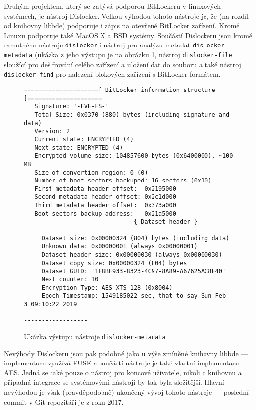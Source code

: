 
Druhým projektem, který se zabývá podporou BitLockeru v linuxových systémech, je nástroj Dislocker. Velkou výhodou tohoto nástroje je, že (na rozdíl od knihovny libbde) podporuje i zápis na otevřené BitLocker zařízení. Kromě Linuxu podporuje také MacOS X a BSD systémy. Součástí Dislockeru jsou kromě samotného nástroje \texttt{dislocker} i nástroj pro analýzu metadat \texttt{dislocker-metadata} (ukázka z jeho výstupu je na obrázku \ref{fig:dislocker-metadata}, nástroj \texttt{dislocker-file} sloužící pro dešifrování celého zařízení a uložení dat do souboru a také nástroj \texttt{dislocker-find} pro nalezení blokových zařízení s BitLocker formátem.

\begin{figure}[h]
		\centering
		\captionsetup{width=0.65\linewidth}
\begin{lstlisting}[frame=none, basicstyle=\ttfamily\small, columns=fullflexible, keepspaces=true]
 =====================[ BitLocker information structure ]=====================
   Signature: '-FVE-FS-'
   Total Size: 0x0370 (880) bytes (including signature and data)
   Version: 2
   Current state: ENCRYPTED (4)
   Next state: ENCRYPTED (4)
   Encrypted volume size: 104857600 bytes (0x6400000), ~100 MB
   Size of convertion region: 0 (0)
   Number of boot sectors backuped: 16 sectors (0x10)
   First metadata header offset:  0x2195000
   Second metadata header offset: 0x2c1d000
   Third metadata header offset:  0x373a000
   Boot sectors backup address:   0x21a5000
   ----------------------------{ Dataset header }----------------------------
     Dataset size: 0x00000324 (804) bytes (including data)
     Unknown data: 0x00000001 (always 0x00000001)
     Dataset header size: 0x00000030 (always 0x00000030)
     Dataset copy size: 0x00000324 (804) bytes
     Dataset GUID: '1F8BF933-8323-4C97-8A89-A67625AC8F40'
     Next counter: 10
     Encryption Type: AES-XTS-128 (0x8004)
     Epoch Timestamp: 1549185022 sec, that to say Sun Feb  3 09:10:22 2019
   --------------------------------------------------------------------------

\end{lstlisting}
		\caption{Ukázka výstupu nástroje \texttt{dislocker-metadata}}
		\label{fig:dislocker-metadata}
\end{figure}

Nevýhody Dislockeru jsou pak podobné jako u výše zmíněné knihovny libbde --- implementace využívá FUSE a součástí nástroje je také vlastní implementace AES. Jedná se také pouze o nástroj pro koncové uživatele, nikoli o knihovnu a případná integrace se systémovými nástroji by tak byla složitější. Hlavní nevýhodou je však (pravděpodobně) ukončený vývoj tohoto nástroje --- poslední commit v Git repozitáři je z roku 2017.

